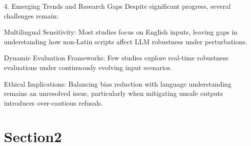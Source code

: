 4. Emerging Trends and Research Gaps
Despite significant progress, several challenges remain:

Multilingual Sensitivity: Most studies focus on English inputs, leaving gaps in understanding how non-Latin scripts affect LLM robustness under perturbations.

Dynamic Evaluation Frameworks: Few studies explore real-time robustness evaluations under continuously evolving input scenarios.

Ethical Implications: Balancing bias reduction with language understanding remains an unresolved issue, particularly when mitigating unsafe outputs introduces over-cautious refusals.
  \section{Section2}